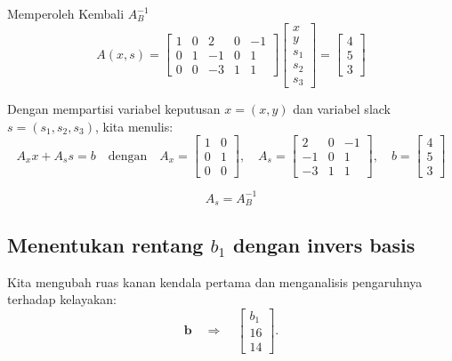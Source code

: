 \begin{remark}{Memperoleh Kembali $A_B^{-1}$}{}
\[
A(x, s) =
\begin{bmatrix}
1 & 0 & 2 & 0 & -1 \\
0 & 1 & -1 & 0 & 1 \\
0 & 0 & -3 & 1 & 1
\end{bmatrix}
\begin{bmatrix}
x \\ y \\ s_1 \\ s_2 \\ s_3
\end{bmatrix}
=
\begin{bmatrix}
4 \\ 5 \\ 3
\end{bmatrix}
\]

Dengan mempartisi variabel keputusan \( x = (x, y) \) dan variabel slack \( s = (s_1, s_2, s_3) \), kita menulis:
\[
A_x x + A_s s = b
\quad \text{dengan} \quad
A_x =
\begin{bmatrix}
1 & 0 \\
0 & 1 \\
0 & 0
\end{bmatrix}, \quad
A_s =
\begin{bmatrix}
2 & 0 & -1 \\
-1 & 0 & 1 \\
-3 & 1 & 1
\end{bmatrix}, \quad
b =
\begin{bmatrix}
4 \\ 5 \\ 3
\end{bmatrix}
\]

\[
A_s = A_B^{-1}
\]

\end{remark}

\subsection{Menentukan rentang \( b_1 \) dengan invers basis}

Kita mengubah ruas kanan kendala pertama dan menganalisis pengaruhnya terhadap kelayakan:
\[
\mathbf{b} \quad \Rightarrow \quad \begin{bmatrix} b_1 \\ 16 \\ 14 \end{bmatrix}.
\]

